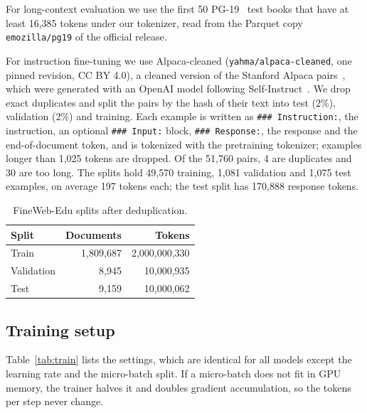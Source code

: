 \documentclass[conference]{IEEEtran}
\begin{document}
For long-context evaluation we use the first 50 PG-19~\cite{rae2020compressive} test books that have
at least 16,385 tokens under our tokenizer, read from the Parquet copy \texttt{emozilla/pg19} of the
official release.

For instruction fine-tuning we use Alpaca-cleaned (\texttt{yahma/alpaca-cleaned}, one pinned revision,
CC BY 4.0), a cleaned version of the Stanford Alpaca pairs~\cite{taori2023alpaca}, which were generated
with an OpenAI model following Self-Instruct~\cite{wang2023selfinstruct}. We drop exact duplicates and
split the pairs by the hash of their text into test (2\%), validation (2\%) and training. Each example
is written as \texttt{\#\#\# Instruction:}, the instruction, an optional \texttt{\#\#\# Input:} block,
\texttt{\#\#\# Response:}, the response and the end-of-document token, and is tokenized with the
pretraining tokenizer; examples longer than 1,025 tokens are dropped. Of the 51,760 pairs, 4 are
duplicates and 30 are too long. The splits hold 49,570 training, 1,081 validation and 1,075 test
examples, on average 197 tokens each; the test split has 170,888 response tokens.

\begin{table}[t]
\centering
\caption{FineWeb-Edu splits after deduplication.}
\label{tab:data}
\begin{tabular}{lrr}
\toprule
Split & Documents & Tokens \\
\midrule
Train & 1,809,687 & 2,000,000,330 \\
Validation & 8,945 & 10,000,935 \\
Test & 9,159 & 10,000,062 \\
\bottomrule
\end{tabular}
\end{table}

\subsection{Training setup}
Table~\ref{tab:train} lists the settings, which are identical for all models except the learning rate
and the micro-batch split. If a micro-batch does not fit in GPU memory, the trainer halves it and
doubles gradient accumulation, so the tokens per step never change.
\end{document}
